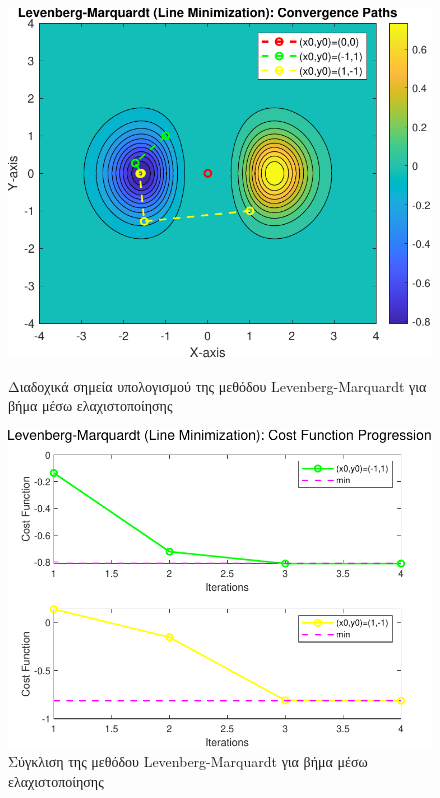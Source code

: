 \documentclass[a4paper,12pt]{article}
\begin{document}
\begin{figure}[h]
    \centering
    \begin{minipage}{0.47\textwidth}
        \centering
        \includegraphics[width=1\linewidth]{plot/levenberg_marquardt_line_minimization_contour.pdf}
        \caption{\small Διαδοχικά σημεία υπολογισμού της μεθόδου  Levenberg-Marquardt  για βήμα μέσω ελαχιστοποίησης}
        \label{fig:levenberg_marquardt_line_minimization_contour}
    \end{minipage} \hfill
    \begin{minipage}{0.47\textwidth}
        \centering
        \includegraphics[width=1\linewidth]{plot/levenberg_marquardt_line_minimization_costs.pdf}
        \caption{\small Σύγκλιση της μεθόδου  Levenberg-Marquardt  για βήμα μέσω ελαχιστοποίησης}
        \label{fig:levenberg_marquardt_line_minimization_costs}
    \end{minipage}
\end{figure}
\end{document}
